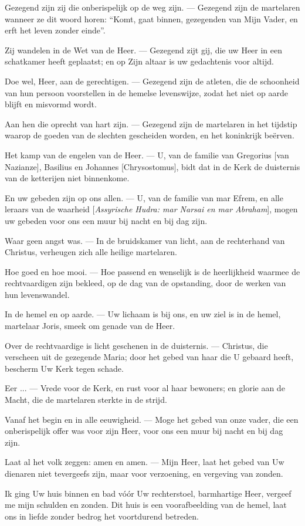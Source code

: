 \documentclass[12pt,twoside,a5paper]{article}
\begin{document}
\begin{halfparskip}
  Gezegend zijn zij die onberispelijk op de weg zijn. --- Gezegend zijn de martelaren wanneer ze dit woord horen: ``Komt, gaat binnen, gezegenden van Mijn Vader, en erft het leven zonder einde''.

  Zij wandelen in de Wet van de Heer. --- Gezegend zijt gij, die uw Heer in een schatkamer heeft geplaatst; en op Zijn altaar is uw gedachtenis voor altijd.

  Doe wel, Heer, aan de gerechtigen. --- Gezegend zijn de atleten, die de schoonheid van hun persoon voorstellen in de hemelse levenswijze, zodat het niet op aarde blijft en misvormd wordt.

  Aan hen die oprecht van hart zijn. --- Gezegend zijn de martelaren in het tijdstip waarop de goeden van de slechten gescheiden worden, en het koninkrijk beërven.

  Het kamp van de engelen van de Heer. --- U, van de familie van Gregorius [van Nazianze], Basilius en Johannes [Chrysostomus], bidt dat in de Kerk de duisternis van de ketterijen niet binnenkome.

  En uw gebeden zijn op ons allen. --- U, van de familie van mar Efrem, en alle leraars van de waarheid [\emph{Assyrische Hudra: mar Narsai en mar Abraham}], mogen uw gebeden voor ons een muur bij nacht en bij dag zijn.

  Waar geen angst was. --- In de bruidskamer van licht, aan de rechterhand van Christus, verheugen zich alle heilige martelaren.

  Hoe goed en hoe mooi. --- Hoe passend en wenselijk is de heerlijkheid waarmee de rechtvaardigen zijn bekleed, op de dag van de opstanding, door de werken van hun levenswandel.

  In de hemel en op aarde. --- Uw lichaam is bij ons, en uw ziel is in de hemel, martelaar Joris, smeek om genade van de Heer.

  Over de rechtvaardige is licht geschenen in de duisternis. --- Christus, die verscheen uit de gezegende Maria; door het gebed van haar die U gebaard heeft, bescherm Uw Kerk tegen schade.

  Eer ... --- Vrede voor de Kerk, en rust voor al haar bewoners; en glorie aan de Macht, die de martelaren sterkte in de strijd.

  Vanaf het begin en in alle eeuwigheid. --- Moge het gebed van onze vader, die een onberispelijk offer was voor zijn Heer, voor ons een muur bij nacht en bij dag zijn.

  Laat al het volk zeggen: amen en amen. --- Mijn Heer, laat het gebed van Uw dienaren niet tevergeefs zijn, maar voor verzoening, en vergeving van zonden.

  Ik ging Uw huis binnen en bad vóór Uw rechterstoel, barmhartige Heer, vergeef me mijn schulden en zonden. Dit huis is een voorafbeelding van de hemel, laat ons in liefde zonder bedrog het voortdurend betreden.
\end{halfparskip}
\end{document}

